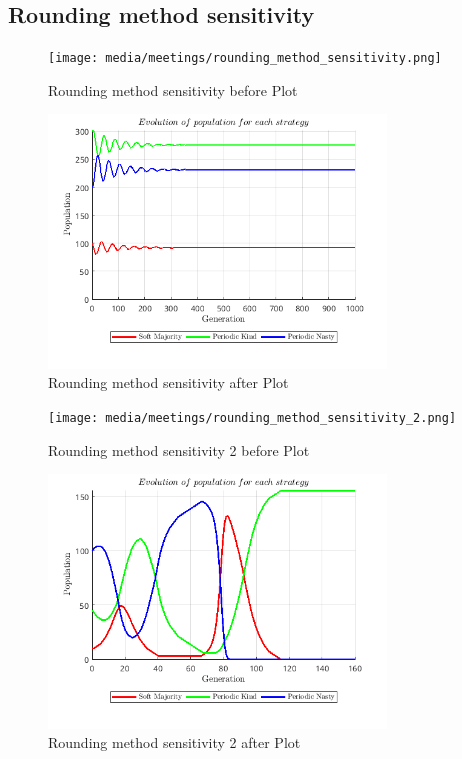 \subsection{Rounding method sensitivity}
\begin{figure}[H]
    \centering
    \texttt{[image: media/meetings/rounding\_method\_sensitivity.png]}
    \caption{Rounding method sensitivity before Plot}
\end{figure}
\begin{figure}[H]
    \centering
    \includegraphics[width=0.8\textwidth]{media/meetings/rounding_method_sensitivity_after.png}
    \caption{Rounding method sensitivity after Plot}
\end{figure}
\begin{figure}[H]
    \centering
    \texttt{[image: media/meetings/rounding\_method\_sensitivity\_2.png]}
    \caption{Rounding method sensitivity 2 before Plot}
\end{figure}
\begin{figure}[H]
    \centering
    \includegraphics[width=0.8\textwidth]{media/meetings/rounding_method_sensitivity_2_after.png}
    \caption{Rounding method sensitivity 2 after Plot}
\end{figure}

